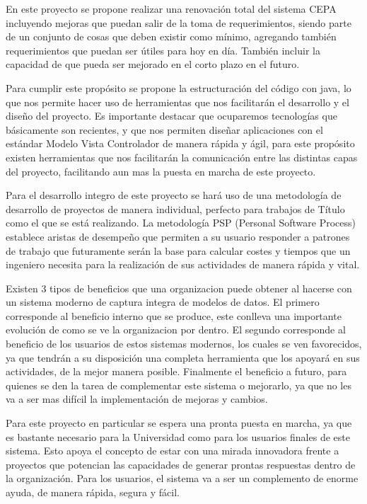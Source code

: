 \documentclass[a4paper,12pt,openany,oneside]{book}
\begin{document}
En este proyecto se propone realizar una renovación total del sistema CEPA incluyendo mejoras que puedan salir de la toma de requerimientos, siendo parte de un conjunto de cosas que deben existir como mínimo, agregando también requerimientos que puedan ser útiles para hoy en día. También incluir la capacidad de que pueda ser mejorado en el corto plazo en el futuro.

Para cumplir este propósito se propone la estructuración del código con java, lo que nos permite hacer uso de herramientas que nos facilitarán el desarrollo y el diseño del proyecto. Es importante destacar que ocuparemos tecnologías que básicamente son recientes, y que nos permiten diseñar aplicaciones con el estándar Modelo Vista Controlador de manera rápida y ágil, para este propósito existen herramientas que nos facilitarán la comunicación entre las distintas capas del proyecto, facilitando aun mas la puesta en marcha de este proyecto.

Para el desarrollo integro de este proyecto se hará uso de una metodología de desarrollo de proyectos de manera individual, perfecto para trabajos de Título como el que se está realizando. La metodología PSP (Personal Software Process) establece aristas de desempeño que permiten a su usuario responder a patrones de trabajo que futuramente serán la base para calcular costes y tiempos que un ingeniero necesita para la realización de sus actividades de manera rápida y vital.

Existen 3 tipos de beneficios que una organizacion puede obtener al hacerse con un sistema moderno de captura integra de modelos de datos. El primero corresponde al beneficio interno que se produce, este conlleva una importante evolución de como se ve la organizacion por dentro. El segundo corresponde al beneficio de los usuarios de estos sistemas modernos, los cuales se ven favorecidos, ya que tendrán a su disposición una completa herramienta que los apoyará en sus actividades, de la mejor manera posible. Finalmente el beneficio a futuro, para quienes se den la tarea de complementar este sistema o mejorarlo, ya que no les va a ser mas difícil la implementación de mejoras y cambios.

Para este proyecto en particular se espera una pronta puesta en marcha, ya que es bastante necesario para la Universidad como para los usuarios finales de este sistema. Esto apoya el concepto de estar con una mirada innovadora frente a proyectos que potencian las capacidades de generar prontas respuestas dentro de la organización. Para los usuarios, el sistema va a ser un complemento de enorme ayuda, de manera rápida, segura y fácil.
\end{document}
